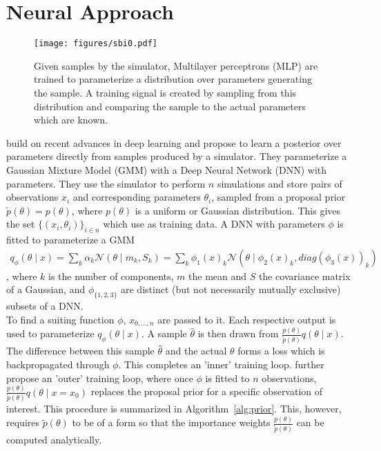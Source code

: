 \documentclass[12pt]{article}
\begin{document}
\section*{Neural Approach}
\begin{figure}
	\centering
	\texttt{[image: figures/sbi0.pdf]}
	\caption{Given samples by the simulator, Multilayer perceptrons (MLP) are trained to parameterize a distribution over parameters generating the sample. A training signal is created by sampling from this distribution and comparing the sample to the actual parameters which are known.}
	\label{fig:sbiloop}
\end{figure} 
\citet{papamakarios2016fast} build on recent advances in deep learning and propose to learn a posterior over parameters directly from samples produced by a simulator. They parameterize a Gaussian Mixture Model (GMM) with a Deep Neural Network (DNN) with parameters. They use the simulator to perform $n$ simulations and store pairs of observations $x_i$ and corresponding parameters $\theta_i$, sampled from a proposal prior $\tilde{p}(\theta) = p(\theta)$, where $p(\theta)$ is a uniform or Gaussian distribution. This gives the set $\lbrace(x_i,\theta_i)\rbrace_{i \in n}$ which \citet{papamakarios2016fast} use as training data. A DNN with parameters $\phi$ is fitted to parameterize a GMM
\begin{align}
	q_{\phi}(\theta\mid x) = \sum_k \alpha_k \mathcal{N}(\theta\mid m_k, S_k) = \sum_k \phi_1(x)_k \mathcal{N}(\theta\mid \phi_2(x)_k, diag(\phi_3(x))_k)
\end{align}
, where $k$ is the number of components, $m$ the mean and $S$ the covariance matrix of a Gaussian, and $\phi_{\lbrace 1,2,3 \rbrace}$ are distinct (but not necessarily mutually exclusive) subsets of a DNN.\\
To find a suiting function $\phi$, $x_{0,...,n}$ are passed to it. Each respective output is used to parameterize $q_{\phi}(\theta\mid x)$. A sample $\hat{\theta}$ is then drawn from $\frac{p(\theta)}{\tilde{p}(\theta)} q(\theta\mid x)$. The difference between this sample $\hat{\theta}$ and the actual $\theta$ forms a loss which is backpropagated through $\phi$. This completes an 'inner' training loop. \citet{papamakarios2016fast} further propose an 'outer' training loop, where once $\phi$ is fitted to $n$ observations, $\frac{p(\theta)}{\tilde{p}(\theta)}q(\theta \mid  x=x_0)$ replaces the proposal prior for a specific observation of interest. This procedure is summarized in Algorithm~\ref{alg:prior}. This, however, requires $\tilde{p}(\theta)$ to be of a form so that the importance weights $\frac{p(\theta)}{\tilde{p}(\theta)}$ can be computed analytically.
\end{document}
